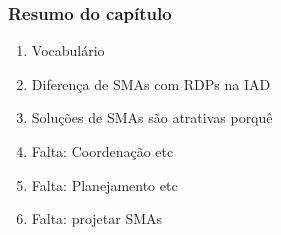 \begin{frame} %

 \frametitle{Resumo do capítulo}

\begin{enumerate}
  \item Vocabulário
 \item Diferença de SMAs com RDPs  na IAD
  \item Soluções de SMAs são atrativas porquê
    
    \item Falta: Coordenação etc
        \item Falta: Planejamento etc
     \item Falta: projetar  SMAs     
  
\end{enumerate}


\end{frame}

